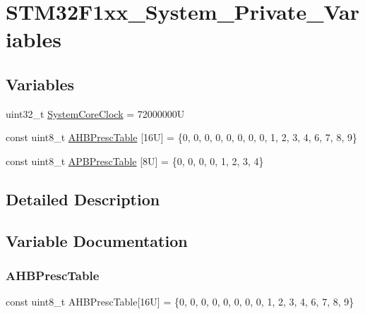 \hypertarget{group___s_t_m32_f1xx___system___private___variables}{}\section{S\+T\+M32\+F1xx\+\_\+\+System\+\_\+\+Private\+\_\+\+Variables}
\label{group___s_t_m32_f1xx___system___private___variables}
\subsection*{Variables}
\begin{DoxyCompactItemize}
\item 
uint32\+\_\+t \mbox{\hyperlink{group___s_t_m32_f1xx___system___private___variables_gaa3cd3e43291e81e795d642b79b6088e6}{System\+Core\+Clock}} = 72000000U
\item 
const uint8\+\_\+t \mbox{\hyperlink{group___s_t_m32_f1xx___system___private___variables_ga53cb26d01524d9560f98101a2c597c40}{A\+H\+B\+Presc\+Table}} \mbox{[}16\+U\mbox{]} = \{0, 0, 0, 0, 0, 0, 0, 0, 1, 2, 3, 4, 6, 7, 8, 9\}
\item 
const uint8\+\_\+t \mbox{\hyperlink{group___s_t_m32_f1xx___system___private___variables_gaa93c123312c9273c0928a79f1203f759}{A\+P\+B\+Presc\+Table}} \mbox{[}8\+U\mbox{]} = \{0, 0, 0, 0, 1, 2, 3, 4\}
\end{DoxyCompactItemize}


\subsection{Detailed Description}


\subsection{Variable Documentation}
\mbox{\label{group___s_t_m32_f1xx___system___private___variables_ga53cb26d01524d9560f98101a2c597c40}} 
\subsubsection{\texorpdfstring{AHBPrescTable}{AHBPrescTable}}
{\footnotesize\ttfamily const uint8\+\_\+t A\+H\+B\+Presc\+Table\mbox{[}16\+U\mbox{]} = \{0, 0, 0, 0, 0, 0, 0, 0, 1, 2, 3, 4, 6, 7, 8, 9\}}

